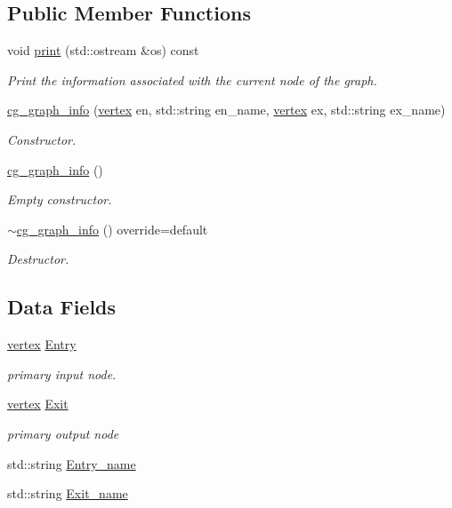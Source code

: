 \subsection*{Public Member Functions}
\begin{DoxyCompactItemize}
\item 
void \hyperlink{structcg__graph__info_a7a3f4560c6c6d6cbbb575dd666b8c598}{print} (std\+::ostream \&os) const
\begin{DoxyCompactList}\small\item\em Print the information associated with the current node of the graph. \end{DoxyCompactList}\item 
\hyperlink{structcg__graph__info_a2e148afc2a1a8899406eb1b779f14480}{cg\+\_\+graph\+\_\+info} (\hyperlink{graph_8hpp_abefdcf0544e601805af44eca032cca14}{vertex} en, std\+::string en\+\_\+name, \hyperlink{graph_8hpp_abefdcf0544e601805af44eca032cca14}{vertex} ex, std\+::string ex\+\_\+name)
\begin{DoxyCompactList}\small\item\em Constructor. \end{DoxyCompactList}\item 
\hyperlink{structcg__graph__info_aa04d1815bea5e28c195b0efc0b0d3c02}{cg\+\_\+graph\+\_\+info} ()
\begin{DoxyCompactList}\small\item\em Empty constructor. \end{DoxyCompactList}\item 
\hyperlink{structcg__graph__info_a371a32e8b7d0d131d0edb40a36df0df6}{$\sim$cg\+\_\+graph\+\_\+info} () override=default
\begin{DoxyCompactList}\small\item\em Destructor. \end{DoxyCompactList}\end{DoxyCompactItemize}
\subsection*{Data Fields}
\begin{DoxyCompactItemize}
\item 
\hyperlink{graph_8hpp_abefdcf0544e601805af44eca032cca14}{vertex} \hyperlink{structcg__graph__info_aa2b4b9714cfa4b6d617e9bd4c9da0944}{Entry}
\begin{DoxyCompactList}\small\item\em primary input node. \end{DoxyCompactList}\item 
\hyperlink{graph_8hpp_abefdcf0544e601805af44eca032cca14}{vertex} \hyperlink{structcg__graph__info_ae324aa2b2134a3de14030533dc05750f}{Exit}
\begin{DoxyCompactList}\small\item\em primary output node \end{DoxyCompactList}\item 
std\+::string \hyperlink{structcg__graph__info_a4d6f2711d19ec9313aeb863ba33e8a33}{Entry\+\_\+name}
\item 
std\+::string \hyperlink{structcg__graph__info_ab20b1d551fba4b5a403032df362ff894}{Exit\+\_\+name}
\end{DoxyCompactItemize}


